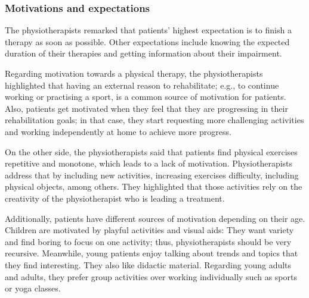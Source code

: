\subsubsection{Motivations and expectations}

The physiotherapists remarked that patients' highest expectation is to finish a therapy as soon as possible. Other expectations include knowing the expected duration of their therapies and getting information about their impairment.

Regarding motivation towards a physical therapy, the physiotherapists highlighted that having an external reason to rehabilitate; e.g., to continue working or practising a sport, is a common source of motivation for patients. Also, patients get motivated when they feel that they are progressing in their rehabilitation goals; in that case, they start requesting more challenging activities and working independently at home to achieve more progress.

On the other side, the physiotherapists said that patients find physical exercises repetitive and monotone, which leads to a lack of motivation. Physiotherapists address that by including new activities, increasing exercises difficulty, including physical objects, among others. They highlighted that those activities rely on the creativity of the physiotherapist who is leading a treatment.

Additionally, patients have different sources of motivation depending on their age. Children are motivated by playful activities and visual aids: They want variety and find boring to focus on one activity; thus, physiotherapists should be very recursive. Meanwhile, young patients enjoy talking about trends and topics that they find interesting. They also like didactic material. Regarding young adults and adults, they prefer group activities over working individually such as sports or yoga classes.

